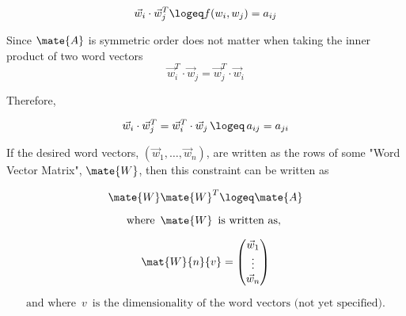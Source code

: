 \documentclass{article}
\begin{document}
		\begin{equation*}
			\vec{w}_{i} \cdot \vec{w}_{j}^T \logeq f(w_i,w_j) = a_{ij}
		\end{equation*}
		
Since $\mate{A}$ is symmetric order does not matter when taking the inner product of two word vectors
		\begin{equation*}
			\vec{w}_{i}^T \cdot \vec{w}_{j} = \vec{w}_{j}^T \cdot \vec{w}_{i}
		\end{equation*}
		
		Therefore,
		
		\begin{equation*}
			\vec{w}_{i} \cdot \vec{w}_{j}^T = \vec{w}_{i}^T \cdot \vec{w}_{j} \, \logeq \, a_{ij} = a_{ji}
		\end{equation*}
		
		If the desired word vectors, $\left( \vec{w}_{1}, \ldots, \vec{w}_{n} \right)$, are written as the rows of some "Word Vector Matrix", $\mate{W}$, then this constraint can be written as
		
		\begin{equation*}
			\mate{W}\mate{W}^T \logeq \mate{A}
		\end{equation*}
		
		\begin{equation*}
			\text{where } \, \mate{W} \, \text{ is written as, }
		\end{equation*}
		
		\begin{equation*}
			\mat{W}{n}{v} = 
			\begin{pmatrix}
				\vec{w}_{1} \\
				\vdots \\
				\vec{w}_{n}
			\end{pmatrix}
		\end{equation*}
		
		\begin{equation*}
			\text{and where } \, v \, \text{ is the dimensionality of the word vectors (not yet specified).}
		\end{equation*}




%
%
\end{document}
